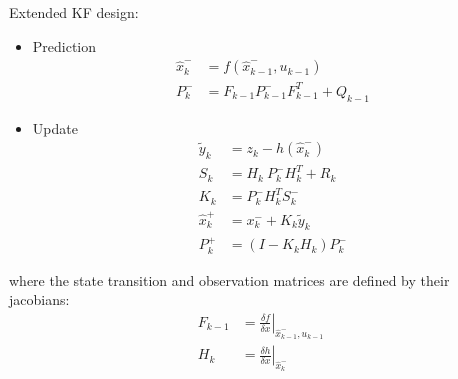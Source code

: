 Extended \ac{KF} design:
\begin{itemize}
\item Prediction
\begin{align}
\hat x_k^- &= f(\hat x_{k-1}^-,u_{k-1})\\
P_k^- &= F_{k-1}P_{k-1}^-F_{k-1}^T+Q_{k-1}
\end{align}

\item Update
\begin{align}
\tilde y_k &= z_k - h(\hat x_k^-)\\
S_k &= H_k\ P_k^-H_k^T + R_k\\
K_k &= P_k^-H_k^TS_k^-\\
\hat x_k^+ &= x_k^- + K_k \tilde y_k\\
P_k^+ &= (I - K_k H_k) P_k^-
\end{align}
\end{itemize}
where the state transition and observation matrices are defined by their jacobians:
\begin{align}
F_{k-1} &= \left.\frac{\delta f}{\delta x}\right|_{\hat x_{k-1}^-,u_{k-1}}\\
H_k &= \left.\frac{\delta h}{\delta x}\right|_{\hat x_{k}^-}
\end{align}